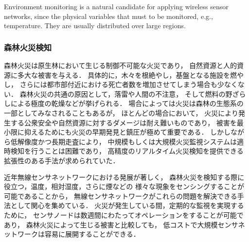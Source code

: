 Environment monitoring is a natural candidate for applying wireless sensor networks, since the physical variables that must to be monitored, e.g., temperature. They are usually distributed over large regions.



\subsubsection{森林火災検知}

\vspace{0.5em}森林火災は原生林において生じる制御不可能な火災であり，
自然資源と人的資源に多大な被害を与える．
具体的に，木々を根絶やし，基盤となる施設を燃やし，
さらには都市部付近における死亡者数を増加させてしまう場合も少なくない．
森林火災の共通の原因として，落雷や人間の不注意，
そして燃料の野ざらしによる極度の乾燥などが挙げられる．
場合によっては火災は森林の生態系の一部としてみなされることもあるが，
ほとんどの場合において，
火災により発生する公衆安全や自然資源に対するダメージは耐え難いものであり，
被害を最小限に抑えるためにも火災の早期発見と鎮圧が極めて重要である．
しかしながら低解像度かつ長期走査により，
中規模もしくは大規模火災監視システムは適時検知を行うことは困難であり，
高精度のリアルタイム火災検知を提供できる拡張性のある手法が求められていた．

近年無線センサネットワークにおける発展が著しく，
森林火災を検知する際に役立つ，温度，相対湿度，さらに煙などの
様々な現象をセンシングすることが可能であることから，
無線センサネットワークがこれらの問題を解決できる手法として関心を集めている．
火災が発生している間，定期的な監視を実現するために，
センサノードは数週間にわたってオペレーションをすることが可能であり，
森林火災によって生じる被害と比較しても，
低コストで大規模センサネットワークは容易に展開することができる．


